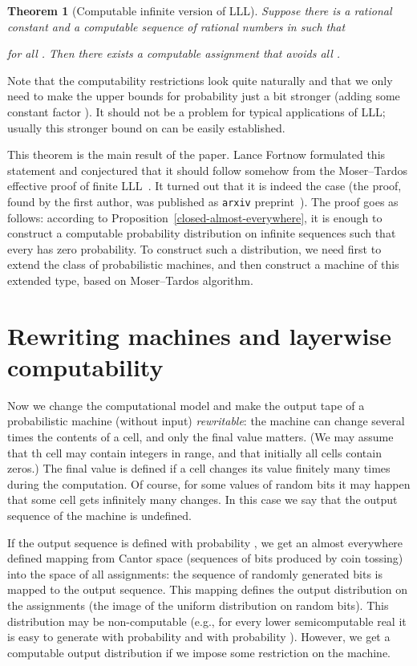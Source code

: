 \documentclass[12pt]{article}
\newtheorem{theorem}{Theorem}
\begin{document}
\begin{theorem}[Computable infinite version of LLL]
\label{computablelll}
Suppose there is a rational constant  and a
computable sequence  of rational numbers in  such that
     
for all . Then there exists a computable assignment that
avoids all .
\end{theorem}

Note that the computability restrictions look quite naturally and that we only need
to make the upper bounds for probability just a bit stronger (adding some constant factor ). It should not be a problem for typical applications of LLL; usually this stronger bound on  can be easily established.

This theorem is the main result of the paper. Lance Fortnow formulated this statement and conjectured that it should follow somehow from the Moser--Tardos effective proof of finite LLL~\cite{moser-tardos}.  It turned out that it is indeed the case (the proof, found by the first author, was published as \texttt{arxiv} preprint~\cite{rumyantsev-positive}). The  proof goes as follows: according to Proposition~\ref{closed-almost-everywhere}, it is enough to construct a computable probability distribution on infinite sequences such that every  has zero probability. To construct such a distribution, we need first to extend the class of probabilistic machines, and then construct a machine of this extended type, based on Moser--Tardos algorithm.

\section{Rewriting machines and layerwise computability}

Now we change the computational model and make the output tape of a probabilistic machine (without input) \emph{rewritable}: the machine can change several times the contents of a cell, and only the final value matters. (We may assume that th cell may contain integers in  range, and that initially all cells contain zeros.) The final value is defined if a cell changes its value finitely many times during the computation. Of course, for some values of random bits it may happen that some cell gets infinitely many changes. In this case we say that the output sequence of the machine is undefined.

If the output sequence is defined with probability , we get an almost everywhere defined mapping from Cantor space (sequences of bits produced by coin tossing) into the space of all assignments: the sequence of randomly generated bits is mapped to the output sequence. This mapping defines the output distribution on the assignments (the image of the uniform distribution on random bits). This distribution may be non-com\-put\-able (e.g., for every lower semicomputable real  it is easy to generate  with probability  and  with probability ). However, we get a computable output distribution if we impose some restriction on the machine.
\end{document}
